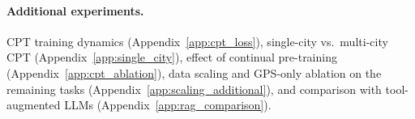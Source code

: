 \documentclass{llmxive}
\providecommand{\arraystretch}{1.05}
\begin{document}
\begin{table}[t]
\centering
\small
\setlength{\tabcolsep}{3pt}
\renewcommand{\arraystretch}{1.05}
\caption{GPS-only ablation on our domain-specific models for \textbf{Optimal Route Generation} with 10,000 test samples across four cities. Only raw GPS coordinates are provided as input.}
\label{tab:gps_ours}
\end{table}
\endgroup

\paragraph{Additional experiments.} CPT training dynamics (Appendix~\ref{app:cpt_loss}), single-city vs.\ multi-city CPT (Appendix~\ref{app:single_city}), effect of continual pre-training (Appendix~\ref{app:cpt_ablation}), data scaling and GPS-only ablation on the remaining tasks (Appendix~\ref{app:scaling_additional}), and comparison with tool-augmented LLMs (Appendix~\ref{app:rag_comparison}).
\end{document}
